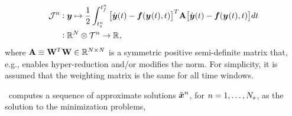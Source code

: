 \begin{equation}\label{eq:obj}
\begin{split} \mathcal{J}^n &\vcentcolon \statey \mapsto
\frac{1}{2} \int_{\timeStartArg{n}}^{\timeEndArg{n}} \big[ \dot{\statey}(t)
- \velocity(\stateyArg{}{t},t) \big]^T \stweightingMatArgt{n}{t} \big[
\dot{\statey}(t) - \velocity(\stateyArg{}{t},t) \big] d t \\
&\vcentcolon \RR{\fomdim}\otimes \timeSpaceArg{n}  \rightarrow
\RR{}, 
\end{split}
\end{equation}
where $\stweightingMatArg{n} \equiv \stweightingMatOneArg{ }^T \stweightingMatOneArg{ } \in \RR{\fomdim \times \fomdim}$ is a
symmetric positive semi-definite matrix that, e.g., enables hyper-reduction and/or modifies the norm. For simplicity, 
it is assumed that the weighting matrix is the same for all time windows. 

\methodAcronym\ computes a sequence of approximate solutions $\approxstateArgnt{n}$, for $n=1,\ldots,\nslabs$, as the solution to the minimization problems,

